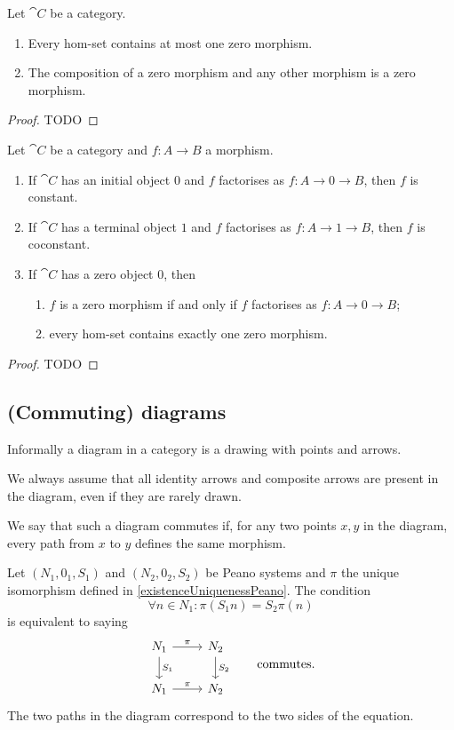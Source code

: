\begin{proposition}
Let $\cat{C}$ be a category.
\begin{enumerate}
\item Every hom-set contains at most one zero morphism.
\item The composition of a zero morphism and any other morphism is a zero morphism.
\end{enumerate}
\end{proposition}
\begin{proof}
TODO
\end{proof}

\begin{proposition}
Let $\cat{C}$ be a category and $f:A\to B$ a morphism.
\begin{enumerate}
\item If $\cat{C}$ has an initial object $0$ and $f$ factorises as $f: A\to 0 \to B$, then $f$ is constant.
\item If $\cat{C}$ has a terminal object $1$ and $f$ factorises as $f: A\to 1 \to B$, then $f$ is coconstant.
\item If $\cat{C}$ has a zero object $0$, then 
\begin{enumerate}
\item $f$ is a zero morphism \textup{if and only if} $f$ factorises as $f: A\to 0\to B$;
\item every hom-set contains exactly one zero morphism.
\end{enumerate}
\end{enumerate}
\end{proposition}
\begin{proof}
TODO
\end{proof}

\subsection{(Commuting) diagrams}
Informally a diagram in a category is a drawing with points and arrows.

We always assume that all identity arrows and composite arrows are present in the diagram, even if they are rarely drawn.

We say that such a diagram commutes if, for any two points $x,y$ in the diagram, every path from $x$ to $y$ defines the same morphism.

\begin{example}
Let $(N_1, 0_1, S_1)$ and $(N_2, 0_2, S_2)$ be Peano systems and $\pi$ the unique isomorphism defined in \ref{existenceUniquenessPeano}. The condition
\[ \forall n\in N_1: \pi(S_1n) = S_2\pi(n) \]
is equivalent to saying
\[ \begin{tikzcd}
N_1 \ar[r, "\pi"] \ar[d, "S_1"] & N_2 \ar[d, "S_2"] \\
N_1 \ar[r, "\pi"] & N_2
\end{tikzcd} \qquad \text{commutes.} \]
The two paths in the diagram correspond to the two sides of the equation.
\end{example}

